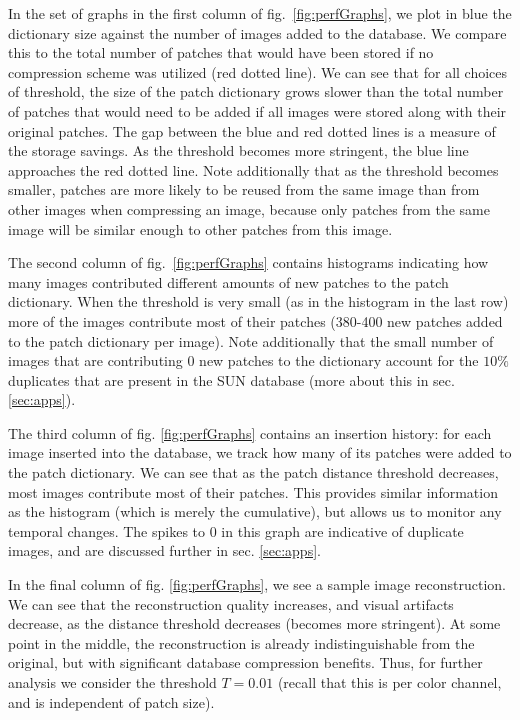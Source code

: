 In the set of graphs in the first column of fig.~\ref{fig:perfGraphs}, we plot in blue the dictionary size against the number of images added to the database. We compare this to the total number of patches that would have been stored if no compression scheme was utilized (red dotted line). We can see that for all choices of threshold, the size of the patch dictionary grows slower than the total number of patches that would need to be added if all images were stored along with their original patches. The gap between the blue and red dotted lines is a measure of the storage savings. As the threshold becomes more stringent, the blue line approaches the red dotted line. Note additionally that as the threshold becomes smaller, patches are more likely to be reused from the same image than from other images when compressing an image, because only patches from the same image will be similar enough to other patches from this image.

The second column of fig.~\ref{fig:perfGraphs} contains histograms indicating how many images contributed different amounts of new patches to the patch dictionary. When the threshold is very small (as in the histogram in the last row) more of the images contribute most of their patches (380-400 new patches added to the patch dictionary per image). Note additionally that the small number of images that are contributing 0 new patches to the dictionary account for the $10\%$ duplicates that are present in the SUN database (more about this in sec. \ref{sec:apps}).

The third column of fig. \ref{fig:perfGraphs} contains an insertion history: for each image inserted into the database, we track how many of its patches were added to the patch dictionary. We can see that as the patch distance threshold decreases, most images contribute most of their patches. This provides similar information as the histogram (which is merely the cumulative), but allows us to monitor any temporal changes. The spikes to 0 in this graph are indicative of duplicate images, and are discussed further in sec. \ref{sec:apps}.

In the final column of fig. \ref{fig:perfGraphs}, we see a sample image reconstruction. We can see that the reconstruction quality increases, and visual artifacts decrease, as the distance threshold decreases (becomes more stringent). At some point in the middle, the reconstruction is already indistinguishable from the original, but with significant database compression benefits. Thus, for further analysis we consider the threshold $T=0.01$ (recall that this is per color channel, and is independent of patch size).

